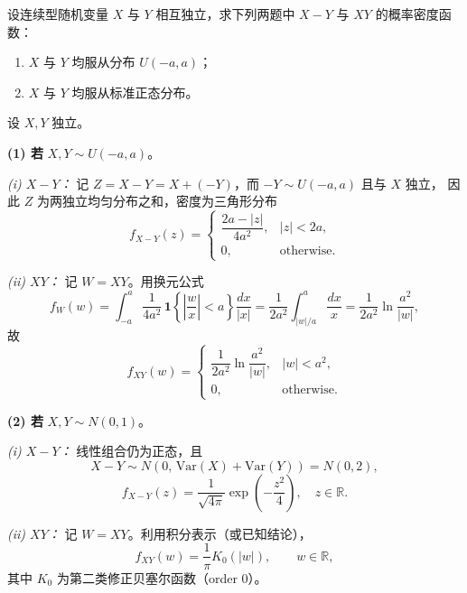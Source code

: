 \begin{homework}[63]
设连续型随机变量 $X$ 与 $Y$ 相互独立，求下列两题中 $X-Y$ 与 $XY$ 的概率密度函数：
\begin{enumerate}[(1)]
  \item $X$ 与 $Y$ 均服从分布 $U(-a,a)$；
  \item $X$ 与 $Y$ 均服从标准正态分布。
\end{enumerate}
\end{homework}
\begin{solution}
设 $X,Y$ 独立。

\medskip
\textbf{(1) 若 } $X,Y\sim U(-a,a)$。

\emph{(i) $X-Y$：} 记 $Z=X-Y=X+(-Y)$，而 $-Y\sim U(-a,a)$ 且与 $X$ 独立，
因此 $Z$ 为两独立均匀分布之和，密度为三角形分布
\[
f_{X-Y}(z)=
\begin{cases}
\dfrac{2a-|z|}{4a^{2}}, & |z|<2a,\\[6pt]
0, & \text{otherwise.}
\end{cases}
\]

\emph{(ii) $XY$：} 记 $W=XY$。用换元公式
\[
f_{W}(w)=\displaystyle\int_{-a}^{a} \frac{1}{4a^{2}}\,
\mathbf{1}\!\left\{\left|\frac{w}{x}\right|<a\right\}\frac{dx}{|x|}
= \frac{1}{2a^{2}}\!\int_{|w|/a}^{a}\frac{dx}{x}
= \frac{1}{2a^{2}}\ln\!\frac{a^{2}}{|w|},
\]
故
\[
f_{XY}(w)=
\begin{cases}
\dfrac{1}{2a^{2}}\ln\!\dfrac{a^{2}}{|w|}, & |w|<a^{2},\\[8pt]
0, & \text{otherwise.}
\end{cases}
\]

\medskip
\textbf{(2) 若 } $X,Y\sim N(0,1)$。

\emph{(i) $X-Y$：} 线性组合仍为正态，且
\[
X-Y\sim N\!\left(0,\,\mathrm{Var}(X)+\mathrm{Var}(Y)\right)=N(0,2),
\]
\[
f_{X-Y}(z)=\frac{1}{\sqrt{4\pi}}\exp\!\left(-\frac{z^{2}}{4}\right),\quad z\in\mathbb{R}.
\]

\emph{(ii) $XY$：} 记 $W=XY$。利用积分表示（或已知结论），
\[
f_{XY}(w)=\frac{1}{\pi}K_{0}(|w|),\qquad w\in\mathbb{R},
\]
其中 $K_{0}$ 为第二类修正贝塞尔函数（order $0$）。

\end{solution}
